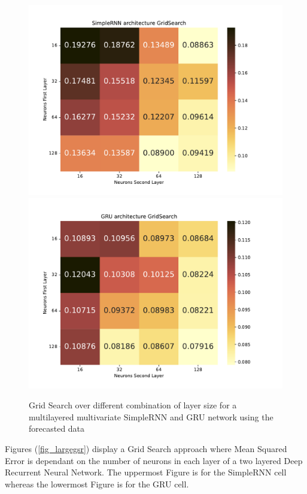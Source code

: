 \documentclass
[twocolumn,
secnumarabic,
nobibnotes,
aps,
prl,
reprint,
groupedaddress,
amsmath,
amssymb,
]{revtex4-2}
\begin{document}
\begin{figure}
  \includegraphics[width=\columnwidth]{figures/Large_forecast_gridsearch_rnn.pdf}
  \includegraphics[width=\columnwidth]{figures/Large_forecast_gridsearch_gru.pdf}
  \caption{\label{fig_largegs}Grid Search over different combination of layer size for a multilayered multivariate SimpleRNN and GRU network using the forecasted data}
\end{figure}

Figures (\ref{fig_largegsr}) display a Grid Search approach where Mean Squared Error is dependant on the number of neurons in each layer of a two layered Deep Recurrent Neural Network. The uppermost Figure is for the SimpleRNN cell whereas the lowermost Figure is for the GRU cell. 
\end{document}
